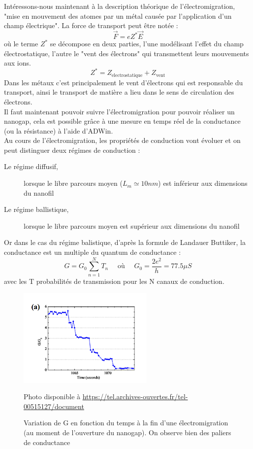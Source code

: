 Intéressons-nous maintenant à la description théorique de l'électromigration, "mise en mouvement des atomes par un métal causée par l'application d'un champ électrique". La force de transport peut être notée :
\[\vec{F}=e Z^* \vec{E}\]
où le terme $Z^*$ se décompose en deux parties, l'une modélisant l'effet du champ électrostatique, l'autre le "vent des électrons" qui transmettent leurs mouvements aux ions.
\[Z^* = Z_{\text{electrostatique}} + Z_{\text{vent}}\]
Dans les métaux c'est principalement le vent d'électrons qui est responsable du transport, ainsi le transport de matière a lieu dans le sens de circulation des électrons\cite{10}.\\

Il faut maintenant pouvoir suivre l'électromigration pour pouvoir réaliser un nanogap, cela est possible grâce à une mesure en temps réel de la conductance (ou la résistance) à l'aide d'ADWin.\\

Au cours de l'électromigration, les propriétés de conduction vont évoluer et on peut distinguer deux régimes de conduction :
\begin{description}
    \item[Le régime diffusif,] lorsque le libre parcours moyen ($L_m \simeq 10nm$) est inférieur aux dimensions du nanofil
    \item[Le régime ballistique,] lorsque le libre parcours moyen est supérieur aux dimensions du nanofil
\end{description}

Or dans le cas du régime balistique, d'après la formule de Landauer Buttiker, la conductance est un multiple du quantum de conductance :
\[G = G_0 \sum_{n=1}^N T_n \quad \text{ où } \quad G_0 = \frac{2e^2}{h} = 77.5 \mu S\]
avec les T probabilités de transmission pour les N canaux de conduction.
\begin{figure}[h]
    \begin{center}
        \includegraphics[width=250px]{Images/Electromigration_graphe}
        \caption{Variation de G en fonction du temps à la fin d'une électromigration (au moment de l'ouverture du nanogap).
On observe bien des paliers de conductance}
        Photo disponible à \url{https://tel.archives-ouvertes.fr/tel-00515127/document}
        \label{fig:}
    \end{center}
\end{figure}

